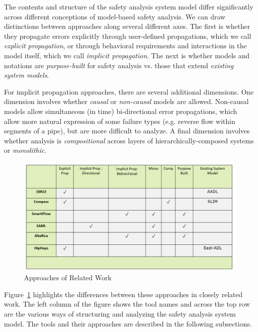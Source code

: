 The contents and structure of the safety analysis system model differ significantly across different conceptions of model-based safety analysis.  We can draw distinctions between approaches along several different axes.  The first is whether they propagate errors explicitly through user-defined propagations, which we call {\em explicit propagation}, or through behavioral requirements and interactions in the model itself, which we call {\em implicit propagation}.  The next is whether models and notations are {\em purpose-built} for safety analysis vs. those that extend {\em existing system models}.

For implicit propagation approaches, there are several additional dimensions.  One dimension involves whether {\em causal} or {\em non-causal} models are allowed.  Non-causal models allow simultaneous (in time) bi-directional error propagations, which allow more natural expression of some failure types (e.g. reverse flow within segments of a pipe), but are more difficult to analyze.  A final dimension involves whether analysis is {\em compositional} across layers of hierarchically-composed systems or {\em monolithic}.  

\begin{figure}[h]
	\begin{center}
		\includegraphics[width=\textwidth]{images/relatedWork.PNG}
	\end{center}
	\caption{Approaches of Related Work}
	\label{fig:relatedWork}
\end{figure}

Figure~\ref{fig:relatedWork} highlights the differences between these approaches in closely related work. The left column of the figure shows the tool names and across the top row are the various ways of structuring and analyzing the safety analysis system model. The tools and their approaches are described in the following subsections. 

